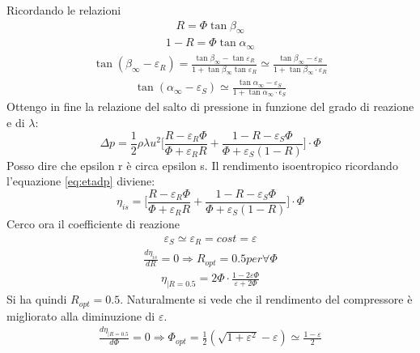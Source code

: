 Ricordando le relazioni
\begin{align*}
R = \Phi \tan \beta_{\infty}
\end{align*}
\begin{align*}
1 - R = \Phi \tan \alpha_{\infty} 
\end{align*}
\begin{align*}
\tan ( \beta_{\infty} - \varepsilon_R ) = \frac{\tan \beta_{\infty} - \tan \varepsilon_R}{1 + \tan \beta_{\infty} \tan \varepsilon_R} \simeq \frac{\tan \beta_{\infty} - \varepsilon_R}{1 + \tan \beta_{\infty} \cdot \varepsilon_R}
\end{align*}
\begin{align*}
\tan (\alpha_{\infty} - \varepsilon_S) \simeq \frac{\tan \alpha_{\infty} - \varepsilon_S}{1 + \tan \alpha_{\infty} \cdot \epsilon_S}
\end{align*}
Ottengo in fine la relazione del salto di pressione in funzione del grado di reazione e di $\lambda$:
\begin{equation}
\Delta p = \frac{1}{2} \rho \lambda u^2 \Bigg[ \frac{R - \varepsilon_R \Phi}{\Phi + \varepsilon_R R} + \frac{1 - R - \varepsilon_S \Phi}{\Phi + \varepsilon_S (1-R)} \Bigg] \cdot \Phi
\end{equation}
Posso dire che epsilon r è circa epsilon s. Il rendimento isoentropico ricordando l'equazione \ref{eq:etadp} diviene:
\begin{equation}
\boxed{ \eta_{is} = \Bigg[ \frac{R - \varepsilon_R \Phi}{\Phi + \varepsilon_R R} + \frac{1 - R - \varepsilon_S \Phi}{\Phi + \varepsilon_S (1-R)} \Bigg] \cdot \Phi }
\end{equation}
Cerco ora il coefficiente di reazione
\begin{align*}
\varepsilon_S \simeq \varepsilon_R = cost = \varepsilon
\end{align*}
\begin{align*}
\frac{d \eta_{is}}{dR} = 0 \Rightarrow R_{opt} = 0.5 per \forall \Phi
\end{align*}
\begin{align*}
\eta_{|R= 0.5} = 2 \Phi \cdot \frac{1- 2 \varepsilon \Phi}{\varepsilon + 2 \Phi}
\end{align*}
Si ha quindi $R_{opt} = 0.5$. 
Naturalmente si vede che il rendimento del compressore è migliorato alla diminuzione di $\varepsilon$.
\begin{align*}
\frac{d\eta_{|R=0.5}}{d \Phi} = 0 \Rightarrow \Phi_{opt} = \frac{1}{2} \left( \sqrt{1 + \varepsilon^2} - \varepsilon \right) \simeq \frac{1 - \varepsilon}{2}
\end{align*}
